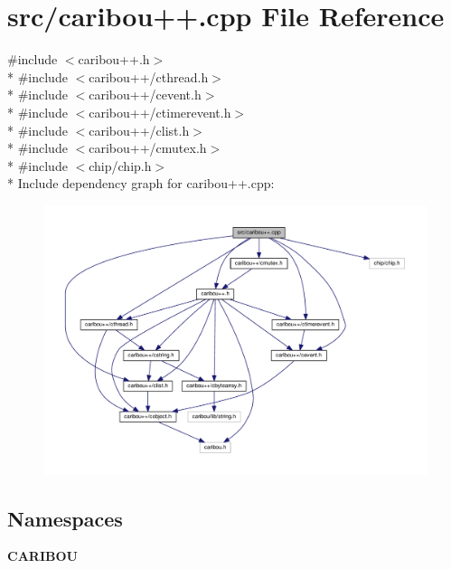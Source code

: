 \section{src/caribou++.cpp File Reference}
\label{caribou_09_09_8cpp}
{\ttfamily \#include $<$caribou++.\-h$>$}\\*
{\ttfamily \#include $<$caribou++/cthread.\-h$>$}\\*
{\ttfamily \#include $<$caribou++/cevent.\-h$>$}\\*
{\ttfamily \#include $<$caribou++/ctimerevent.\-h$>$}\\*
{\ttfamily \#include $<$caribou++/clist.\-h$>$}\\*
{\ttfamily \#include $<$caribou++/cmutex.\-h$>$}\\*
{\ttfamily \#include $<$chip/chip.\-h$>$}\\*
Include dependency graph for caribou++.cpp\-:\nopagebreak
\begin{figure}[H]
\begin{center}
\leavevmode
\includegraphics[width=350pt]{caribou_09_09_8cpp__incl}
\end{center}
\end{figure}
\subsection*{Namespaces}
\begin{DoxyCompactItemize}
\item 
{\bf C\-A\-R\-I\-B\-O\-U}
\end{DoxyCompactItemize}
